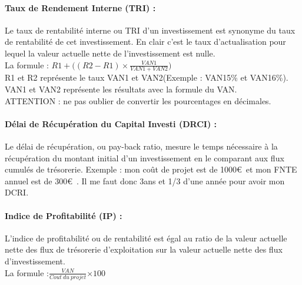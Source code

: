 \documentclass{report}
\begin{document}
\paragraph{Taux de Rendement Interne (TRI) :}
Le taux de rentabilité interne ou TRI d'un investissement est synonyme du taux de rentabilité de cet investissement. En clair c'est le taux d'actualisation pour lequel la valeur actuelle nette de l'investissement est nulle. 
\\La formule : $R1 + (( R2- R1) \times${\Large $ \frac{VAN1}{VAN1 + VAN2})$}
\\R1 et R2 représente le taux VAN1 et VAN2(Exemple : VAN15\% et VAN16\%). VAN1 et VAN2 représente les résultats avec la formule du VAN.
\\ATTENTION : ne pas oublier de convertir les pourcentages en décimales. 

\paragraph{Délai de Récupération du Capital Investi (DRCI) :}
Le délai de récupération, ou pay-back ratio, mesure le temps nécessaire à la récupération du montant initial d'un investissement en le comparant aux flux cumulés de trésorerie.
Exemple : mon coût de projet est de 1000\euro\ et mon FNTE annuel est de 300\euro\ . Il me faut donc 3ans et 1/3 d'une année pour avoir mon DCRI.

\paragraph{Indice de Profitabilité (IP) :}
L'indice de profitabilité ou de rentabilité est égal au ratio de la valeur actuelle nette des flux de trésorerie d'exploitation sur la valeur actuelle nette des flux d'investissement. 
\\La formule :{\Large  $\frac{VAN}{Cout\ du\ projet}$}$\times 100$
\end{document}
